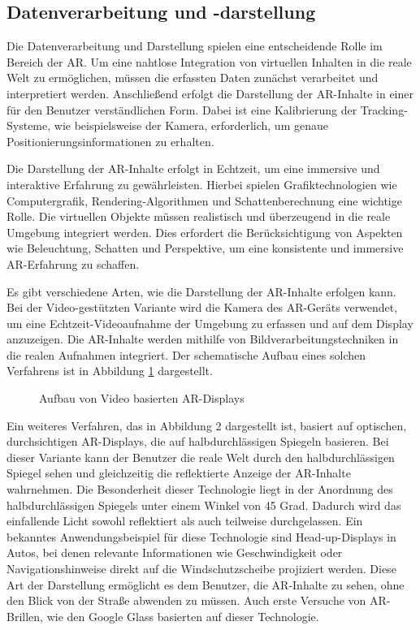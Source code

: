\subsection{Datenverarbeitung und -darstellung}
Die Datenverarbeitung und Darstellung spielen eine entscheidende Rolle im
Bereich der AR. Um eine nahtlose Integration von virtuellen
Inhalten in die reale Welt zu ermöglichen, müssen die erfassten Daten zunächst
verarbeitet und interpretiert werden. Anschließend erfolgt die Darstellung der
AR-Inhalte in einer für den Benutzer verständlichen Form. Dabei ist eine
Kalibrierung der Tracking-Systeme, wie beispielsweise der Kamera, erforderlich,
um genaue Positionierungsinformationen zu erhalten.

Die Darstellung der AR-Inhalte erfolgt in Echtzeit, um eine immersive und
interaktive Erfahrung zu gewährleisten. Hierbei spielen Grafiktechnologien wie
Computergrafik, Rendering-Algorithmen und Schattenberechnung eine wichtige Rolle. Die
virtuellen Objekte müssen realistisch und überzeugend in die reale Umgebung
integriert werden. Dies erfordert die Berücksichtigung von Aspekten wie
Beleuchtung, Schatten und Perspektive, um eine konsistente und immersive
AR-Erfahrung zu schaffen.

Es gibt verschiedene Arten, wie die Darstellung der AR-Inhalte erfolgen kann.
Bei der Video-gestützten Variante wird die Kamera des AR-Geräts verwendet, um
eine Echtzeit-Videoaufnahme der Umgebung zu erfassen und auf dem Display
anzuzeigen. Die AR-Inhalte werden mithilfe von Bildverarbeitungstechniken in
die realen Aufnahmen integriert. Der schematische Aufbau eines solchen
Verfahrens ist in Abbildung \ref{fig:VBAR} dargestellt.\\

\begin{figure}[h]
      \centering
      
      \caption[width=0.7\columnwidth]{Aufbau von Video basierten AR-Displays \cite{billinghurst2015survey}}
      \label{fig:VBAR}
\end{figure}

Ein weiteres Verfahren, das in Abbildung 2 dargestellt ist, basiert auf
optischen, durchsichtigen AR-Displays, die auf halbdurchlässigen Spiegeln
basieren. Bei dieser Variante kann der Benutzer die reale Welt durch den
halbdurchlässigen Spiegel sehen und gleichzeitig die reflektierte Anzeige der
AR-Inhalte wahrnehmen. Die Besonderheit dieser Technologie liegt in der
Anordnung des halbdurchlässigen Spiegels unter einem Winkel von 45 Grad.
Dadurch wird das einfallende Licht sowohl reflektiert als auch teilweise
durchgelassen. Ein bekanntes Anwendungsbeispiel für diese Technologie sind
Head-up-Displays in Autos, bei denen relevante Informationen wie
Geschwindigkeit oder Navigationshinweise direkt auf die Windschutzscheibe
projiziert werden. Diese Art der Darstellung ermöglicht es dem Benutzer, die
AR-Inhalte zu sehen, ohne den Blick von der Straße abwenden zu müssen. Auch
erste Versuche von AR-Brillen, wie den Google Glass basierten auf dieser
Technologie.\\

